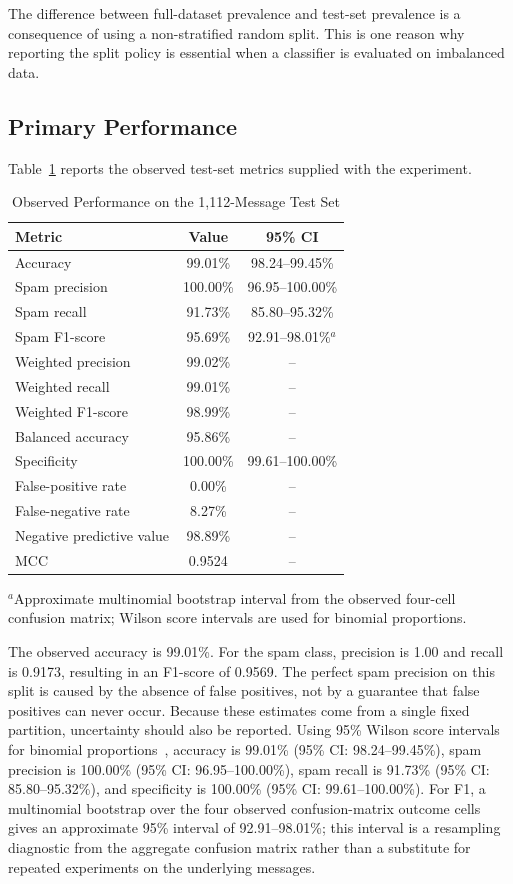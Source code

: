 \documentclass[conference]{IEEEtran}
\begin{document}
The difference between full-dataset prevalence and test-set prevalence is a consequence of using a non-stratified random split. This is one reason why reporting the split policy is essential when a classifier is evaluated on imbalanced data.

\subsection{Primary Performance}
Table~\ref{tab:results} reports the observed test-set metrics supplied with the experiment.

\begin{table}[t]
\caption{Observed Performance on the 1,112-Message Test Set}
\label{tab:results}
\centering
\scriptsize
\begin{tabular}{lcc}
\toprule
Metric & Value & 95\% CI \\
\midrule
Accuracy & 99.01\% & 98.24--99.45\% \\
Spam precision & 100.00\% & 96.95--100.00\% \\
Spam recall & 91.73\% & 85.80--95.32\% \\
Spam F1-score & 95.69\% & 92.91--98.01\%$^{a}$ \\
Weighted precision & 99.02\% & -- \\
Weighted recall & 99.01\% & -- \\
Weighted F1-score & 98.99\% & -- \\
Balanced accuracy & 95.86\% & -- \\
Specificity & 100.00\% & 99.61--100.00\% \\
False-positive rate & 0.00\% & -- \\
False-negative rate & 8.27\% & -- \\
Negative predictive value & 98.89\% & -- \\
MCC & 0.9524 & -- \\
\bottomrule
\end{tabular}
\vspace{1mm}
\parbox{0.96\columnwidth}{\scriptsize $^{a}$Approximate multinomial bootstrap interval from the observed four-cell confusion matrix; Wilson score intervals are used for binomial proportions.}
\end{table}

The observed accuracy is 99.01\%. For the spam class, precision is 1.00 and recall is 0.9173, resulting in an F1-score of 0.9569. The perfect spam precision on this split is caused by the absence of false positives, not by a guarantee that false positives can never occur. Because these estimates come from a single fixed partition, uncertainty should also be reported. Using 95\% Wilson score intervals for binomial proportions~\cite{agresti1998ci}, accuracy is 99.01\% (95\% CI: 98.24--99.45\%), spam precision is 100.00\% (95\% CI: 96.95--100.00\%), spam recall is 91.73\% (95\% CI: 85.80--95.32\%), and specificity is 100.00\% (95\% CI: 99.61--100.00\%). For F1, a multinomial bootstrap over the four observed confusion-matrix outcome cells gives an approximate 95\% interval of 92.91--98.01\%; this interval is a resampling diagnostic from the aggregate confusion matrix rather than a substitute for repeated experiments on the underlying messages.
\end{document}
